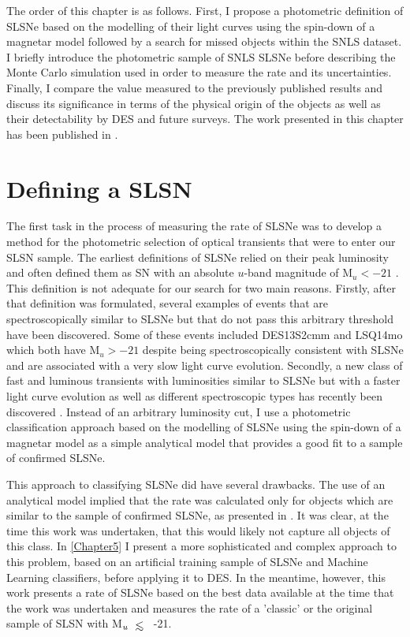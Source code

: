 The order of this chapter is as follows. First, I propose a photometric definition of SLSNe based on the modelling of their light curves using the spin-down of a magnetar model followed by a search for missed objects within the SNLS dataset. I briefly introduce the photometric sample of SNLS SLSNe before describing the Monte Carlo simulation used in order to measure the rate and its uncertainties. Finally, I compare the value measured to the previously published results and discuss its significance in terms of the physical origin of the objects as well as their detectability by DES and future surveys. The work presented in this chapter has been published in \citet{Prajs2016}.

\section{Defining a SLSN}
\label{sec:SLSNDefinition}
The first task in the process of measuring the rate of SLSNe was to develop a method for the photometric selection of optical transients that were to enter our SLSN sample. The earliest definitions of SLSNe relied on their peak luminosity and often defined them as SN with an absolute $u$-band magnitude of $\mathrm{M}_{u}<-21$ \citep{Gal-Yam2012}. This definition is not adequate for our search for two main reasons. Firstly, after that definition was formulated, several examples of events that are spectroscopically similar to SLSNe but that do not pass this arbitrary threshold have been discovered. Some of these events included DES13S2cmm \citep{Papadopoulos2015} and LSQ14mo \citep{Leloudas2015a} which both have $\mathrm{M}_u > -21$ despite being spectroscopically consistent with SLSNe and are associated with a very slow light curve evolution. Secondly, a new class of fast and luminous transients with luminosities similar to SLSNe but with a faster light curve evolution as well as different spectroscopic types has recently been discovered \citep{Drout2014,Arcavi2016,Pursiainen2018}. Instead of an arbitrary luminosity cut, I use a photometric classification approach based on the modelling of SLSNe using the spin-down of a magnetar model as a simple analytical model that provides a good fit to a sample of confirmed SLSNe.

This approach to classifying SLSNe did have several drawbacks. The use of an analytical model implied that the rate was calculated only for objects which are similar to the sample of confirmed SLSNe, as presented in . It was clear, at the time this work was undertaken, that this would likely not capture all objects of this class. In \cref{Chapter5} I present a more sophisticated and complex approach to this problem, based on an artificial training sample of SLSNe and Machine Learning classifiers, before applying it to DES. In the meantime, however, this work presents a rate of SLSNe based on the best data available at the time that the work was undertaken and measures the rate of a 'classic' or the original sample of SLSN with M$_u~\ltsim $~-21.

